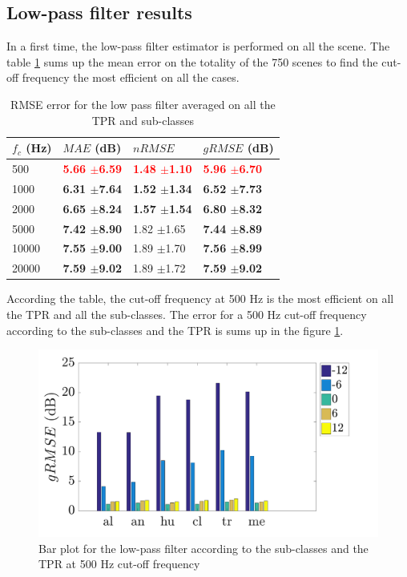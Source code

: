 \documentclass[twocolumn,a4paper,10pt]{article}
\begin{document}
\subsection{Low-pass filter results}
In a first time, the low-pass filter estimator is performed on all the scene. The table \ref{tab:results_filter} sums up the mean error on the totality of the 750 scenes to find the cut-off frequency the most efficient on all the cases. \\

\begin{table}[h]
\centering
\begin{tabular}{llll}
$f_c$ (Hz) & $MAE$ (dB) & $nRMSE$ & $gRMSE$ (dB) \\ \hline
 500 & \textbf{\textcolor{red}{5.66 $\pm$6.59}} & \textbf{\textcolor{red}{1.48 $\pm$1.10}} & \textbf{\textcolor{red}{5.96 $\pm$6.70}} \\ 
 1000 & \textbf{6.31 $\pm$7.64} & \textbf{1.52 $\pm$1.34} & \textbf{6.52 $\pm$7.73} \\ 
 2000 & \textbf{6.65 $\pm$8.24} & \textbf{1.57 $\pm$1.54} & \textbf{6.80 $\pm$8.32} \\ 
 5000 & \textbf{7.42 $\pm$8.90} & 1.82 $\pm$1.65 & \textbf{7.44 $\pm$8.89} \\ 
10000 & \textbf{7.55 $\pm$9.00} & 1.89 $\pm$1.70 & \textbf{7.56 $\pm$8.99} \\ 
20000 & \textbf{7.59 $\pm$9.02} & 1.89 $\pm$1.72 & \textbf{7.59 $\pm$9.02} \\ 
\end{tabular} 
\caption{RMSE error for the low pass filter averaged on all the TPR and sub-classes}
\label{tab:results_filter}
\end{table}

According the table, the cut-off frequency at 500 Hz is the most efficient on all the TPR and all the sub-classes. The error for a 500 Hz cut-off frequency according to the sub-classes and the TPR is sums up in the figure \ref{fig:filterAmbiance}.\\

\begin{figure}[hbtp]
\centering
\includegraphics[width=\linewidth]{../image/filterAmbianceBar.pdf}
\caption{Bar plot for the low-pass filter according to the sub-classes and the TPR at 500 Hz cut-off frequency}
\label{fig:filterAmbiance}
\end{figure}
\end{document}

